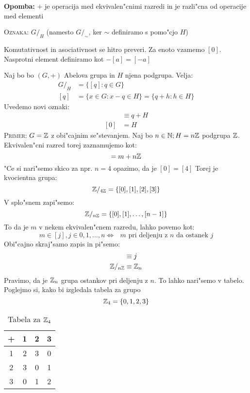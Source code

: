 \textbf{Opomba:} $+$ je operacija med ekvivalen"cnimi razredi in je razli"cna od operacije med elementi

\textsc{Oznaka:} $G/_H$ (namesto $G/_\sim$, ker $\sim$ definiramo s pomo"cjo $H$)

Komutativnost in asociativnost se hitro preveri. Za enoto vzamemo $[0]$. Nasprotni element definiramo kot $-[a] = [-a]$

Naj bo bo $(G, +)$ Abelova grupa in $H$ njena podgrupa. Velja:
\begin{align*}
G/_H &= \{[q]: q \in G\} \\
[q] &= \{x \in G: x - q \in H\} = \{q+h: h \in H\}
\end{align*}
Uvedemo novi oznaki:
\begin{align*}
[q] &\equiv q + H \\
[0] &= H
\end{align*}
\textsc{Primer:} $G = \mathbb{Z}$ z obi"cajnim se"stevanjem. Naj bo $n \in \mathbb{N}; H = n\mathbb{Z}$ podgrupa $\mathbb{Z}$. Ekvivalen"cni razred torej zaznamujemo kot:
\begin{equation*}
[m] = m + n\ZZ
\end{equation*}
"Ce si nari"semo skico za npr. $n = 4$ opazimo, da je $[0] = [4]$ Torej je kvocientna grupa:
\begin{equation*}
\mathbb{Z}/_{4\mathbb{Z}} = \{[0], [1], [2], [3]\}
\end{equation*}
V splo"snem zapi"semo:
\begin{equation*}
\mathbb{Z}/_{n\mathbb{Z}} = \{[0], [1], \ldots, [n-1]\}
\end{equation*}
To da je $m$ v nekem ekvivalen"cnem razredu, lahko povemo kot:
\begin{equation*}
m \in [j], j \in {0, 1, \ldots, n} \iff \text{ $m$ pri deljenju z $n$ da ostanek $j$}
\end{equation*}
Obi"cajno skraj"samo zapis in pi"semo:
\begin{align*}
[j] &\equiv j \\
\ZZ/_{n\ZZ} &\equiv \ZZ_n
\end{align*}
Pravimo, da je $\mathbb{Z}_n$ grupa ostankov pri deljenju z $n$. To lahko nari"semo v tabelo. Poglejmo si, kako bi izgledala tabela za grupo
\begin{equation*}
\mathbb{Z}_4 = \{0, 1, 2, 3\}
\end{equation*}
\begin{table}[!htbp]
	\centering
	\caption{Tabela za $\mathbb{Z}_4$}
	\begin{tabular}{c|ccc}
		+ & 1 & 2 & 3  \\ \hline
		1 & 2 & 3 & 0 \\
		2 & 3 & 0 & 1 \\
		3 & 0 & 1 & 2
	\end{tabular}
\end{table}
%
